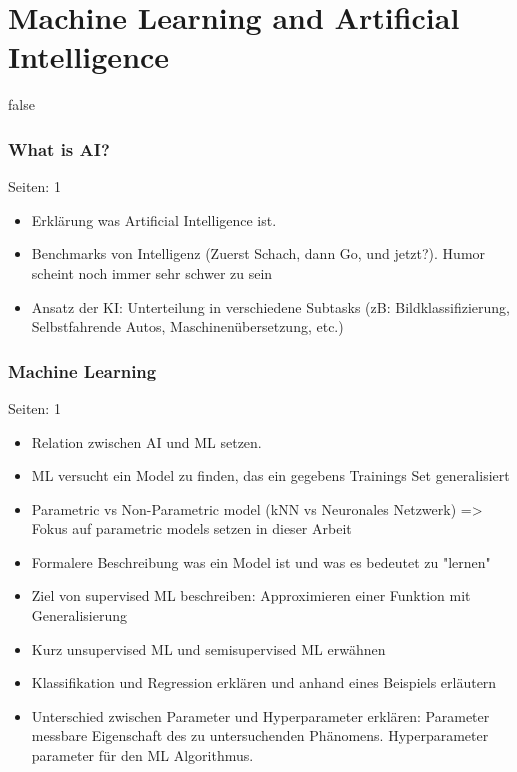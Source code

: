 \documentclass[draft,final,oneside]{vutinfth} %
\begin{document}
\section{Machine Learning and Artificial Intelligence}
\if false
\subsubsection{What is AI?}
Seiten: 1
\begin{itemize}

\item Erklärung was Artificial Intelligence ist.
\item Benchmarks von Intelligenz (Zuerst Schach, dann Go, und jetzt?). Humor scheint noch immer sehr schwer zu sein
\item Ansatz der KI: Unterteilung in verschiedene Subtasks (zB: Bildklassifizierung, Selbstfahrende Autos, Maschinenübersetzung, etc.)

\end{itemize}

\subsubsection{Machine Learning}
Seiten: 1
\begin{itemize}

\item Relation zwischen AI und ML setzen.
\item ML versucht ein Model zu finden, das ein gegebens Trainings Set generalisiert
\item Parametric vs Non-Parametric model (kNN vs Neuronales Netzwerk) => Fokus auf parametric models setzen in dieser Arbeit
\item Formalere Beschreibung was ein Model ist und was es bedeutet zu "lernen"
\item Ziel von supervised ML beschreiben: Approximieren einer Funktion mit Generalisierung
\item Kurz unsupervised ML und semisupervised ML erwähnen
\item Klassifikation und Regression erklären und anhand eines Beispiels erläutern
\item Unterschied zwischen Parameter und Hyperparameter erklären: Parameter messbare Eigenschaft des zu untersuchenden Phänomens. Hyperparameter parameter für den ML Algorithmus.

\end{itemize}
\end{document}
